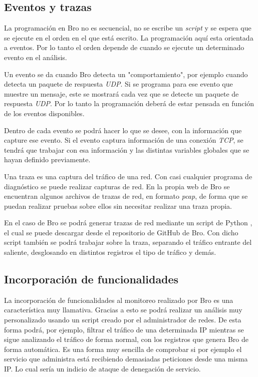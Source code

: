 \subsection{Eventos y trazas}

La programación en Bro no es secuencial, no se escribe un \textit{script} y se espera que se ejecute en el orden 
en el que está escrito. La programación aquí esta orientada a eventos. Por lo tanto el orden depende de cuando 
se ejecute un determinado evento en el análisis.

\intro Un evento se da cuando Bro detecta un "comportamiento", por ejemplo cuando detecta un paquete 
de respuesta \textit{UDP}. Si se programa para ese evento que muestre un mensaje, este se mostrará cada vez que se detecte un paquete de respuesta \textit{UDP}. Por lo tanto la programación deberá de estar pensada en función de los eventos disponibles.

\intro Dentro de cada evento se podrá hacer lo que se desee, con la información que capture ese evento. Si 
el evento captura información de una conexión \textit{TCP}, se tendrá que trabajar con esa información y las 
distintas variables globales que se hayan definido previamente.

\intro Una traza es una captura del tráfico de una red. Con casi cualquier programa de diagnóstico se puede 
realizar capturas de red. En la propia web de Bro se encuentran algunos archivos de trazas de red, en 
formato \textit{pcap}, de forma que se puedan realizar pruebas sobre ellos sin necesitar realizar una 
traza propia.

\intro En el caso de Bro se podrá generar trazas de red mediante un script de Python
\cite{brotrace}, el cual se puede descargar desde el repositorio de GitHub de Bro. Con dicho script también 
se podrá trabajar sobre la traza, separando el tráfico entrante del saliente, desglosando en distintos registros 
el tipo de tráfico y demás.


\subsection{Incorporación de funcionalidades}

La incorporación de funcionalidades al monitoreo realizado por Bro es una característica muy llamativa. Gracias 
a esto se podrá realizar un análisis muy personalizado usando un script creado por el administrador de redes. De 
esta forma podrá, por ejemplo, filtrar el tráfico de una determinada IP mientras se sigue analizando el tráfico 
de forma normal, con los registros que genera Bro de forma automática. Es una forma muy sencilla de comprobar 
si por ejemplo el servicio que administra está recibiendo demasiadas peticiones desde una misma IP. Lo cual 
sería un indicio de ataque de denegación de servicio.


